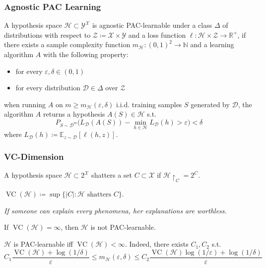 \documentclass[UTF8,11pt,colorlinks,compress,openany]{beamer}%
\begin{document}
\begin{frame}\frametitle{Agnostic PAC Learning}
\setlength\abovedisplayskip{0pt}
\setlength\belowdisplayskip{0pt}
	\begin{definition}
		A hypothesis space $\mathcal{H}\subset\mathcal{Y}^{\mathcal{X}}$ is agnostic PAC-learnable under a class $\Delta$ of distributions with respect to $\mathcal{Z}\coloneqq \mathcal{X}\times\mathcal{Y}$ and a loss function $\ell:\mathcal{H}\times\mathcal{Z}\to\mathbb{R}^+$, if there exists a sample complexity function $m_{\mathcal{H}}: (0,1)^2\to\mathbb{N}$ and a learning algorithm $A$ with the following property:
		\begin{itemize}
			\item for every $\varepsilon,\delta\in(0,1)$
			\item for every distribution $\mathcal{D}\in\Delta$ over $\mathcal{Z}$
		\end{itemize}
		when running $A$ on $m\geq m_{\mathcal{H}}(\varepsilon,\delta)$ i.i.d. training samples $S$ generated by $\mathcal{D}$, the algorithm $A$ returns a hypothesis $A(S)\in\mathcal{H}$ s.t.
		\[P_{S\sim\mathcal{D}^m}\Big(L_{\mathcal{D}}(A(S))-\min\limits_{h\in\mathcal{H}}L_{\mathcal{D}}(h)>\varepsilon\Big)<\delta\]
		where $L_{\mathcal{D}}(h)\coloneqq \mathbb{E}_{z\sim\mathcal{D}}\left[\ell(h,z)\right]$.
	\end{definition}
\end{frame}

\begin{frame}\frametitle{VC-Dimension}
\begin{definition}[Shattering]
A hypothesis space $\mathcal{H}\subset 2^{\mathcal{X}}$ shatters a set $C\subset\mathcal{X}$ if $\mathcal{H}{\restriction_C}=2^C$.
\end{definition}
\begin{definition}[VC-Dimension]
$\operatorname{VC}(\mathcal{H})\coloneqq \sup\big\{|C|: \mathcal{H} \mbox{ shatters } C\big\}$.
\end{definition}
{\footnotesize\emph{If someone can explain every phenomena, her explanations are worthless.}}
\begin{theorem}
If $\operatorname{VC}(\mathcal{H})=\infty$, then $\mathcal{H}$ is not PAC-learnable.
\end{theorem}
\begin{theorem}
$\mathcal{H}$ is PAC-learnable iff $\operatorname{VC}(\mathcal{H})<\infty$. Indeed, there exists $C_1,C_2$ s.t.
\[C_1\frac{\operatorname{VC}(\mathcal{H})+\log(1/\delta)}{\varepsilon}\leq m_{\mathcal{H}}(\varepsilon,\delta)\leq C_2\frac{\operatorname{VC}(\mathcal{H})\log(1/\varepsilon)+\log(1/\delta)}{\varepsilon}\]
\end{theorem}
\end{frame}
\end{document}
